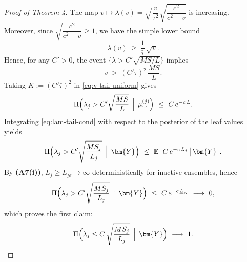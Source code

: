 \documentclass[11pt]{article}
\newcommand{\E}{\mathbb{E}} %
\theoremstyle{plain}
\theoremstyle{definition}
\theoremstyle{plain}
\begin{document}
\begin{proof}[Proof of Theorem 4]
The map $v\mapsto \lambda(v)=\sqrt{\dfrac{v}{\tau^2}}\sqrt{\dfrac{c^2}{c^2-v}}$ is increasing.
Moreover, since $\sqrt{\dfrac{c^2}{c^2-v}}\ge 1$, we have the simple lower bound
\begin{equation}\label{eq:lambda-lower}
\lambda(v)\ \ge\ \frac{1}{\bar\tau}\,\sqrt{v}.
\end{equation}
Hence, for any $C'>0$, the event $\{\lambda > C'\sqrt{MS/L}\}$ implies
\[
v\ >\ (C'\bar\tau)^2\,\frac{MS}{L}.
\]
Taking $K:=(C'\bar\tau)^2$ in \eqref{eq:v-tail-uniform} gives
\begin{equation}
\label{eq:lam-tail-cond}
\Pi\Big(\lambda_j > C'\sqrt{\frac{MS}{L}}\,\Bigm|\,\mu^{(j)}_{\cdot,\cdot}\Big)\ \le\ C\,e^{-c\,L}.
\end{equation}
Integrating \eqref{eq:lam-tail-cond} with respect to the posterior of the leaf values yields
\[
\Pi\Big(\lambda_j > C'\sqrt{\frac{MS_j}{L_j}}\,\Bigm|\,\bm{Y}\Big)
\ \le\ \E \big[\,C\,e^{-c\,L_j}\,\big|\,\bm{Y}\big].
\]
By \textbf{(A7(i))}, $L_j\ge \underline L_N\to\infty$ deterministically for inactive ensembles, hence
\[
\Pi\Big(\lambda_j > C'\sqrt{\frac{MS_j}{L_j}}\,\Bigm|\,\bm{Y}\Big)
\ \le\ C\,e^{-c\,\underline L_N}
\ \longrightarrow\ 0,
\]
which proves the first claim:
\[
\Pi\Big(\lambda_j \le C\,\sqrt{\frac{MS_j}{L_j}}\,\Bigm|\,\bm{Y}\Big)\ \longrightarrow\ 1.
\]


\end{proof}
\end{document}
